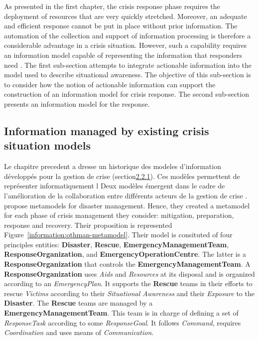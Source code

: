 As presented in the first chapter, the crisis response phase requires the deployment of resources that are very quickly stretched.
Moreover, an adequate and efficient response cannot be put in place without prior information.
The automation of the collection and support of information processing is therefore a considerable advantage in a crisis situation.
However, such a capability requires an information model capable of representing the information that responders need \parencite{comesBringingStructureDisaster2015}.
The first sub-section attempts to integrate actionable information into the model used to describe situational awareness.
The objective of this sub-section is to consider how the notion of actionable information can support the construction of an information model for crisis response.
The second sub-section presents an information model for the response.

\subsection{Information managed by existing crisis situation models}
\label{sec:crisismetamodel}
Le chapitre precedent a dresse un historique des modeles d'information développés pour la gestion de crise (section\hyperref[sec:lit-information-models]{2.2.1}).
Ces modèles permettent de représenter informatiquement l
Deux modèles émergent dans le cadre de l'amélioration de la collaboration entre différents acteurs de la gestion de crise \parencite{othmanDevelopmentValidationDisaster2014,benabenMetamodelItsOntology2008}.
\textcite{othmanDevelopmentValidationDisaster2014} propose metamodels for disaster management.
Hence, they created a metamodel for each phase of crisis management they consider: mitigation, preparation, response and recovery.
Their proposition is represented Figure~\ref{information:othman-metamodel}.
Their model is consituted of four principles entities: \textbf{Disaster}, \textbf{Rescue}, \textbf{EmergencyManagementTeam}, \textbf{ResponseOrganization}, and \textbf{EmergencyOperationCentre}.
The latter is a \textbf{ResponseOrganization} that controls the \textbf{EmergencyManagementTeam}.
A \textbf{ResponseOrganization} uses \textit{Aids} and \textit{Resources} at its disposal and is organized according to an \textit{EmergencyPlan}.
It supports the \textbf{Rescue} teams in their efforts to rescue \textit{Victims} according to their \textit{Situational Awareness} and their \textit{Exposure} to the \textbf{Disaster}.
The \textbf{Rescue} teams are managed by a \textbf{EmergencyManagementTeam}.
This team is in charge of defining a set of \textit{ResponseTask} according to some \textit{ResponseGoal}.
It follows \textit{Command}, requires \textit{Coordination} and uses means of \textit{Communication}.

